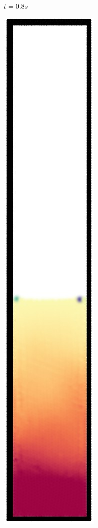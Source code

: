 \begin{figure}[h]
\begin{subfigure}[t]{0.09\textwidth}
    \caption{\small{$t=0.8s$}}
  \end{subfigure}%
  \begin{subfigure}[t]{0.09\textwidth}
    \includegraphics[width=\textwidth]{images/oscillate/090.jpg}

\end{subfigure}
\end{figure}
